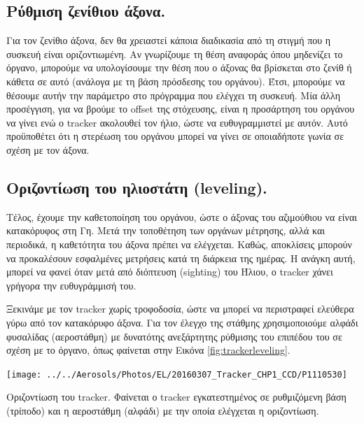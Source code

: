 \documentclass[
  a4paper,
  twoside,
  titlepage,
  12pt]{article}
\numberwithin{equation}{section}
\numberwithin{figure}{section}
\numberwithin{table}{section}
\begin{document}
\hypertarget{ux3c1ux3cdux3b8ux3bcux3b9ux3c3ux3b7-ux3b6ux3b5ux3bdux3afux3b8ux3b9ux3bfux3c5-ux3acux3beux3bfux3bdux3b1.}{%
\subsection{Ρύθμιση ζενίθιου άξονα.}\label{ux3c1ux3cdux3b8ux3bcux3b9ux3c3ux3b7-ux3b6ux3b5ux3bdux3afux3b8ux3b9ux3bfux3c5-ux3acux3beux3bfux3bdux3b1.}}

Για τον ζενίθιο άξονα, δεν θα χρειαστεί κάποια διαδικασία από τη στιγμή που η συσκευή είναι οριζοντιωμένη. Αν γνωρίζουμε τη θέση αναφοράς όπου μηδενίζει το όργανο, μπορούμε να υπολογίσουμε την θέση που ο άξονας θα βρίσκεται στο ζενίθ ή κάθετα σε αυτό (ανάλογα με τη βάση πρόσδεσης του οργάνου). Έτσι, μπορούμε να θέσουμε αυτήν την παράμετρο στο πρόγραμμα που ελέγχει τη συσκευή. Μία άλλη προσέγγιση, για να βρούμε το offset της στόχευσης, είναι η προσάρτηση του οργάνου να γίνει ενώ ο tracker ακολουθεί τον ήλιο, ώστε να ευθυγραμμιστεί με αυτόν. Αυτό προϋποθέτει ότι η στερέωση του οργάνου μπορεί να γίνει σε οποιαδήποτε γωνία σε σχέση με τον άξονα.

\hypertarget{ux3bfux3c1ux3b9ux3b6ux3bfux3bdux3c4ux3afux3c9ux3c3ux3b7-ux3c4ux3bfux3c5-ux3b7ux3bbux3b9ux3bfux3c3ux3c4ux3acux3c4ux3b7-leveling.}{%
\subsection{Οριζοντίωση του ηλιοστάτη (leveling).}\label{ux3bfux3c1ux3b9ux3b6ux3bfux3bdux3c4ux3afux3c9ux3c3ux3b7-ux3c4ux3bfux3c5-ux3b7ux3bbux3b9ux3bfux3c3ux3c4ux3acux3c4ux3b7-leveling.}}

Τέλος, έχουμε την καθετοποίηση του οργάνου, ώστε ο άξονας του αζιμούθιου να είναι κατακόρυφος στη Γη. Μετά την τοποθέτηση των οργάνων μέτρησης, αλλά και περιοδικά, η καθετότητα του άξονα πρέπει να ελέγχεται. Καθώς, αποκλίσεις μπορούν να προκαλέσουν εσφαλμένες μετρήσεις κατά τη διάρκεια της ημέρας. Η ανάγκη αυτή, μπορεί να φανεί όταν μετά από διόπτευση (sighting) του Ήλιου, ο tracker χάνει γρήγορα την ευθυγράμμισή του.

Ξεκινάμε με τον tracker χωρίς τροφοδοσία, ώστε να μπορεί να περιστραφεί ελεύθερα γύρω από τον κατακόρυφο άξονα. Για τον έλεγχο της στάθμης χρησιμοποιούμε αλφάδι φυσαλίδας (αεροστάθμη) με δυνατότης ανεξάρτητης ρύθμισης του επιπέδου του σε σχέση με το όργανο, όπως φαίνεται στην Εικόνα \ref{fig:trackerleveling}.

\begin{img}

{\centering \texttt{[image: ../../Aerosols/Photos/EL/20160307\_Tracker\_CHP1\_CCD/P1110530]} 

}

\caption{Οριζοντίωση του tracker. Φαίνεται ο tracker εγκατεστημένος σε ρυθμιζόμενη βάση (τρίποδο) και η αεροστάθμη (αλφάδι) με την οποία ελέγχεται η οριζοντίωση.}\label{fig:trackerleveling}
\end{img}
\end{document}
